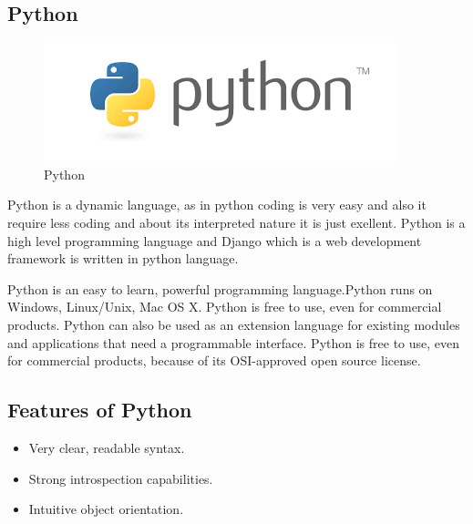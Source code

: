 \subsection{Python}
\begin{figure}[h]
	\centering \includegraphics[scale=0.3]{input/images/python.png}
	\caption{Python}
\end{figure}
\noindent Python is a dynamic language, as in python coding is very easy and 
also it require less coding and about its interpreted nature it is 
just exellent. Python is a high level programming language and Django 
which is a web development framework is written in python language.

Python is an easy to learn, powerful programming language.Python runs 
on Windows, Linux/Unix, Mac OS X. Python is free to use, even for 
commercial products. Python can also be used as an extension language 
for existing modules and applications that need a programmable interface.  
Python is free to use, even for commercial products, because of its 
OSI-approved open source license.
\subsection{Features of Python}
\begin{itemize}
	\item Very clear, readable syntax.
	\item Strong introspection capabilities.
	\item Intuitive object orientation.

\end{itemize}

